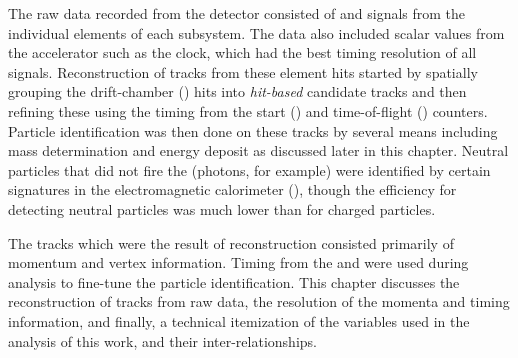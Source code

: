 The raw data recorded from the  detector consisted of  and  signals from the individual elements of each subsystem. The data also included scalar values from the accelerator such as the  clock, which had the best timing resolution of all signals. Reconstruction of tracks from these element hits started by spatially grouping the drift-chamber () hits into \emph{hit-based} candidate tracks and then refining these using the timing from the start () and time-of-flight () counters. Particle identification was then done on these tracks by several means including mass determination and energy deposit as discussed later in this chapter. Neutral particles that did not fire the  (photons, for example) were identified by certain signatures in the electromagnetic calorimeter (), though the efficiency for detecting neutral particles was much lower than for charged particles.

The tracks which were the result of reconstruction consisted primarily of momentum and vertex information. Timing from the  and  were used during analysis to fine-tune the particle identification. This chapter discusses the reconstruction of tracks from raw data, the resolution of the momenta and timing information, and finally, a technical itemization of the variables used in the analysis of this work, and their inter-relationships.





%
